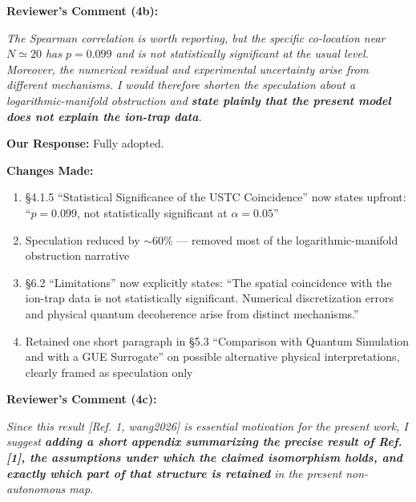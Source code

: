 \documentclass[11pt]{article}
\begin{document}
\vspace{0.3cm}
\noindent\textbf{Reviewer's Comment (4b):}
\begin{quotebox}
\itshape The Spearman correlation is worth reporting, but the specific co-location near $N \simeq 20$ has $p = 0.099$ and is not statistically significant at the usual level. Moreover, the numerical residual and experimental uncertainty arise from different mechanisms. I would therefore shorten the speculation about a logarithmic-manifold obstruction and \textbf{state plainly that the present model does not explain the ion-trap data}.
\end{quotebox}

\noindent\textbf{Our Response:} Fully adopted.

\noindent\textbf{Changes Made:}
\begin{enumerate}
\item \S4.1.5 ``Statistical Significance of the USTC Coincidence'' now states upfront: ``$p=0.099$, not statistically significant at $\alpha=0.05$''
\item Speculation reduced by $\sim$60\% --- removed most of the logarithmic-manifold obstruction narrative
\item \S6.2 ``Limitations'' now explicitly states: ``The spatial coincidence with the ion-trap data is not statistically significant. Numerical discretization errors and physical quantum decoherence arise from distinct mechanisms.''
\item Retained one short paragraph in \S5.3 ``Comparison with Quantum Simulation and with a GUE Surrogate'' on possible alternative physical interpretations, clearly framed as speculation only
\end{enumerate}

\vspace{0.3cm}
\noindent\textbf{Reviewer's Comment (4c):}
\begin{quotebox}
\itshape Since this result [Ref. 1, wang2026] is essential motivation for the present work, I suggest \textbf{adding a short appendix summarizing the precise result of Ref. [1], the assumptions under which the claimed isomorphism holds, and exactly which part of that structure is retained} in the present non-autonomous map.
\end{quotebox}
\end{document}
